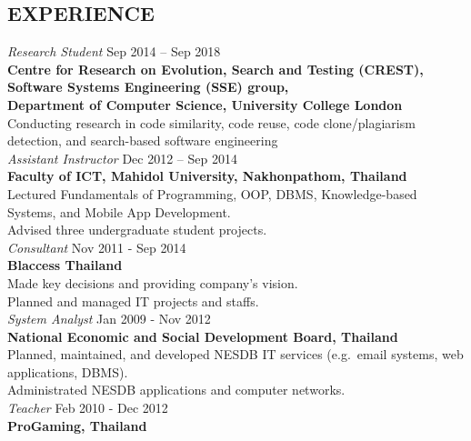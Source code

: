 \documentclass[margin, 10pt]{res} %
\begin{document}
\begin{resume}
\newpage
 
\section{EXPERIENCE}

{\sl Research Student} \hfill Sep 2014 -- Sep 2018 \\
\textbf{Centre for Research on Evolution, Search and Testing (CREST), \\ Software Systems Engineering (SSE) group, \\ Department of Computer Science, University College London}\\
Conducting research in code similarity, code reuse, code clone/plagiarism detection, and search-based software engineering \vspace{4mm} \\
{\sl Assistant Instructor} \hfill Dec 2012 -- Sep 2014 \\
\textbf{Faculty of ICT, Mahidol University, Nakhonpathom, Thailand} \\
Lectured Fundamentals of Programming, OOP, DBMS, Knowledge-based Systems, and Mobile App Development. \\
Advised three undergraduate student projects. \vspace{3mm} \\
{\sl Consultant} \hfill Nov 2011 - Sep 2014 \\
\textbf{Blaccess Thailand} \\
Made key decisions and providing company's vision. \\
Planned and managed IT projects and staffs. \vspace{3mm} \\
{\sl System Analyst} \hfill Jan 2009 - Nov 2012\\
\textbf{National Economic and Social Development Board, Thailand}\\
Planned, maintained, and developed NESDB IT services (e.g.~email systems, web applications, DBMS).\\
Administrated NESDB applications and computer networks. \vspace{3mm} \\
{\sl Teacher} \hfill Feb 2010 - Dec 2012 \\
\textbf{ProGaming, Thailand}\\

\end{resume}
\end{document}
